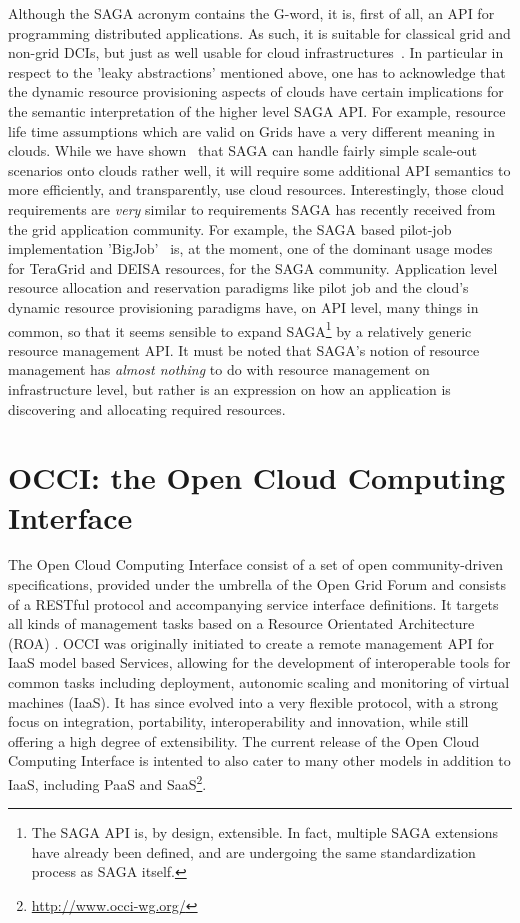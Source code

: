 \documentclass[10pt,conference,final,letterpaper,twoside,twocolumn,]{IEEEtran}
\newcommand{\I}[1]{\textit{#1}}
\begin{document}
  Although the SAGA acronym contains the G-word, it is, first of all,
  an API for programming distributed applications.  As such, it is
  suitable for classical grid and non-grid DCIs, but just as well
  usable for cloud infrastructures~\cite{sagacloud...}.  In particular
  in respect to the 'leaky abstractions' mentioned above, one has to
  acknowledge that the dynamic resource provisioning aspects of clouds
  have certain implications for the semantic interpretation of the
  higher level SAGA API.  For example, resource life time assumptions
  which are valid on Grids have a very different meaning in clouds.
  While we have shown~\cite{sagacloud...} that SAGA can handle fairly
  simple scale-out scenarios onto clouds rather well, it will require
  some additional API semantics to more efficiently, and
  transparently, use cloud resources.  Interestingly, those cloud
  requirements are \I{very} similar to requirements SAGA has recently
  received from the grid application community.  For example, the SAGA
  based pilot-job implementation 'BigJob'~\cite{bigjob} is, at the
  moment, one of the dominant usage modes for TeraGrid and DEISA
  resources, for the SAGA community.  Application level resource
  allocation and reservation paradigms like pilot job and the cloud's
  dynamic resource provisioning paradigms have, on API level, many
  things in common, so that it seems sensible to expand
  SAGA\footnote{The SAGA API is, by design, extensible.  In fact,
  multiple SAGA extensions have already been defined, and are
  undergoing the same standardization process as SAGA itself.} by a
  relatively generic resource management API.  It must be noted that
  SAGA's notion of resource management has \I{almost nothing} to do
  with resource management on infrastructure level, but rather is an
  expression on how an application is discovering and allocating
  required resources.
  

\section{OCCI: the Open Cloud Computing Interface}
\label{sec:occi}

 The Open Cloud Computing Interface consist of a set of open
 community-driven specifications, provided under the umbrella of the
 Open Grid Forum and consists of a RESTful \cite{REST_Fielding}
 protocol and accompanying service interface definitions.  It targets
 all kinds of management tasks based on a Resource Orientated
 Architecture (ROA) \cite{RR2007}.  OCCI was originally initiated to
 create a remote management API for IaaS model based Services,
 allowing for the development of interoperable tools for common tasks
 including deployment, autonomic scaling and monitoring of virtual
 machines (IaaS).  It has since evolved into a very flexible protocol,
 with a strong focus on integration, portability, interoperability and
 innovation, while still offering a high degree of extensibility.  The
 current release of the Open Cloud Computing Interface is intented to
 also cater to many other models in addition to IaaS, including PaaS
 and SaaS\footnote{\url{http://www.occi-wg.org/}}.
\end{document}
